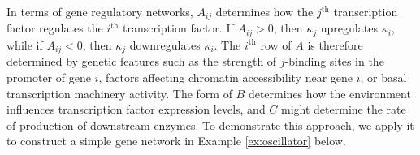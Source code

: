 \documentclass{article}
\newcommand{\1}{\mathbbm{1}}
\begin{document}
In terms of gene regulatory networks, $A_{ij}$ determines how the $j^\text{th}$ transcription factor regulates the $i^\text{th}$ transcription factor.
If $A_{ij} > 0$, then $\kappa_j$ upregulates $\kappa_i$, while if $A_{ij} < 0$, then $\kappa_j$ downregulates $\kappa_i$.
The $i^\text{th}$ row of $A$ is therefore determined by genetic features such as
the strength of $j$-binding sites in the promoter of gene $i$,
factors affecting chromatin accessibility near gene $i$,
or basal transcription machinery activity.
The form of $B$ determines how the environment influences transcription factor expression levels,
and $C$ might determine the rate of production of downstream enzymes.
To demonstrate this approach, we apply it to construct a simple gene network in Example \ref{ex:oscillator} below.
\end{document}
